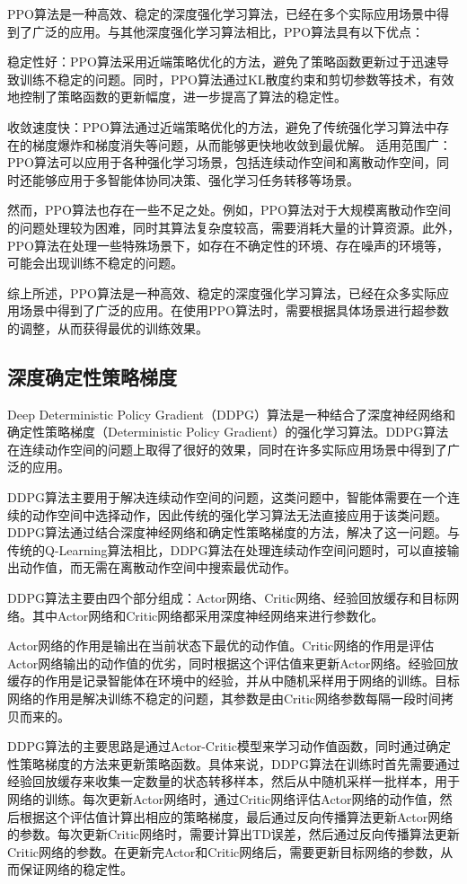 PPO算法是一种高效、稳定的深度强化学习算法，已经在多个实际应用场景中得到了广泛的应用。与其他深度强化学习算法相比，PPO算法具有以下优点：

稳定性好：PPO算法采用近端策略优化的方法，避免了策略函数更新过于迅速导致训练不稳定的问题。同时，PPO算法通过KL散度约束和剪切参数等技术，有效地控制了策略函数的更新幅度，进一步提高了算法的稳定性。

收敛速度快：PPO算法通过近端策略优化的方法，避免了传统强化学习算法中存在的梯度爆炸和梯度消失等问题，从而能够更快地收敛到最优解。
适用范围广：PPO算法可以应用于各种强化学习场景，包括连续动作空间和离散动作空间，同时还能够应用于多智能体协同决策、强化学习任务转移等场景。

然而，PPO算法也存在一些不足之处。例如，PPO算法对于大规模离散动作空间的问题处理较为困难，同时其算法复杂度较高，需要消耗大量的计算资源。此外，PPO算法在处理一些特殊场景下，如存在不确定性的环境、存在噪声的环境等，可能会出现训练不稳定的问题。

综上所述，PPO算法是一种高效、稳定的深度强化学习算法，已经在众多实际应用场景中得到了广泛的应用。在使用PPO算法时，需要根据具体场景进行超参数的调整，从而获得最优的训练效果。


\subsection{深度确定性策略梯度}

Deep Deterministic Policy Gradient（DDPG）算法是一种结合了深度神经网络和确定性策略梯度（Deterministic Policy Gradient）的强化学习算法。DDPG算法在连续动作空间的问题上取得了很好的效果，同时在许多实际应用场景中得到了广泛的应用。

DDPG算法主要用于解决连续动作空间的问题，这类问题中，智能体需要在一个连续的动作空间中选择动作，因此传统的强化学习算法无法直接应用于该类问题。DDPG算法通过结合深度神经网络和确定性策略梯度的方法，解决了这一问题。与传统的Q-Learning算法相比，DDPG算法在处理连续动作空间问题时，可以直接输出动作值，而无需在离散动作空间中搜索最优动作。

DDPG算法主要由四个部分组成：Actor网络、Critic网络、经验回放缓存和目标网络。其中Actor网络和Critic网络都采用深度神经网络来进行参数化。

Actor网络的作用是输出在当前状态下最优的动作值。Critic网络的作用是评估Actor网络输出的动作值的优劣，同时根据这个评估值来更新Actor网络。经验回放缓存的作用是记录智能体在环境中的经验，并从中随机采样用于网络的训练。目标网络的作用是解决训练不稳定的问题，其参数是由Critic网络参数每隔一段时间拷贝而来的。

DDPG算法的主要思路是通过Actor-Critic模型来学习动作值函数，同时通过确定性策略梯度的方法来更新策略函数。具体来说，DDPG算法在训练时首先需要通过经验回放缓存来收集一定数量的状态转移样本，然后从中随机采样一批样本，用于网络的训练。每次更新Actor网络时，通过Critic网络评估Actor网络的动作值，然后根据这个评估值计算出相应的策略梯度，最后通过反向传播算法更新Actor网络的参数。每次更新Critic网络时，需要计算出TD误差，然后通过反向传播算法更新Critic网络的参数。在更新完Actor和Critic网络后，需要更新目标网络的参数，从而保证网络的稳定性。

